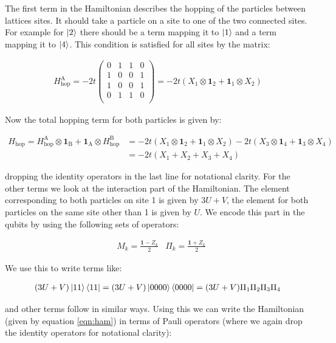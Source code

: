 \documentclass[10 pt, a4paper]{article}
\begin{document}
The first term in the Hamiltonian describes the hopping of the particles between lattices sites. It should take a particle on a site to one of the two connected sites. For example for $\ket{2}$ there should be a term mapping it to $\ket{1}$ and a term mapping it to $\ket{4}$. This condition is satisfied for all sites by the matrix:

\begin{align*}
H_\mathrm{hop}^\mathrm{A} = -2t \begin{pmatrix}
0 & 1 & 1 & 0 \\
1 & 0 & 0 & 1 \\
1 & 0 & 0 & 1 \\
0 & 1 & 1 & 0 \\
\end{pmatrix} = -2 t (X_1 \otimes \mathbf{1}_2 + \mathbf{1}_1 \otimes X_2)
\end{align*}

Now the total hopping term for both particles is given by:

\begin{align*}
H_\mathrm{hop} = H_\mathrm{hop}^\mathrm{A} \otimes \mathbf{1}_\mathrm{B}  +  \mathbf{1}_\mathrm{A} \otimes H_\mathrm{hop}^\mathrm{B} &= -2 t (X_1 \otimes \mathbf{1}_2 + \mathbf{1}_1 \otimes X_2) -2 t (X_3 \otimes \mathbf{1}_4 + \mathbf{1}_3 \otimes X_4) \\
&= -2t(X_1 + X_2 + X_3 + X_4)
\end{align*}

dropping the identity operators in the last line for notational clarity. For the other terms we look at the interaction part of the Hamiltonian. The element corresponding to both particles on site 1 is given by $3U + V$, the element for both particles on the same site other than 1 is given by $U$. We encode this part in the qubits by using the following sets of operators:

\begin{align*}
&M_k = \frac{\mathbf{1} - Z_k}{2} &\Pi_k = \frac{\mathbf{1} + Z_k}{2}
\end{align*}

We use this to write terms like:

\begin{align*}
(3U + V) \ket{11} \bra{11} = (3U + V) \ket{0000} \bra{0000} = (3U + V) \Pi_1 \Pi_2 \Pi_3 \Pi_4
\end{align*}

and other terms follow in similar ways. Using this we can write the Hamiltonian (given by equation \ref{eqn:ham}) in terms of Pauli operators (where we again drop the identity operators for notational clarity):
\end{document}
